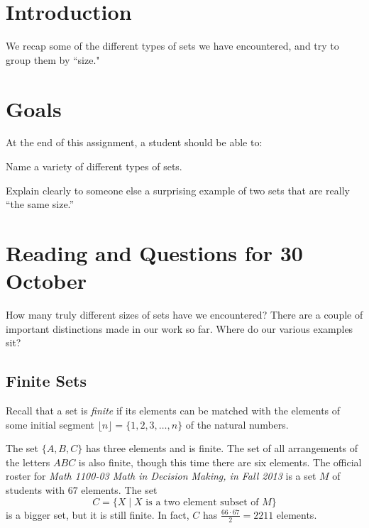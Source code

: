 \documentclass[12pt,letterpaper]{article}
\theoremstyle{definition}
\begin{document}
\setlength{\parskip}{1ex plus 0.5ex minus 0.2ex}
\setlength{\parindent}{0pt}

\pagestyle{fancy}
\cfoot{}

\section*{Introduction}
We recap some of the different types of sets we have encountered, and try to group them by ``size."

\section*{Goals}
At the end of this assignment, a student should be able to:
\begin{compactitem}
\item Name a variety of different types of sets.
\item Explain clearly to someone else a surprising example of two sets that are really ``the same size.''
\end{compactitem}

\section*{Reading and Questions for 30 October}

How many truly different sizes of sets have we encountered?
There are a couple of important distinctions made in our work so far.
Where do our various examples sit?

\subsection*{Finite Sets}

Recall that a set is \emph{finite} if its elements can be matched with the elements of some initial segment $\lfloor n \rfloor = \{ 1, 2, 3, \ldots , n \}$ of the natural numbers.

The set $\{A, B, C\}$ has three elements and is finite.
The set of all arrangements of the letters $ABC$ is also finite, though this time there are six elements.
The official roster for \emph{Math 1100-03 Math in Decision Making, in Fall 2013} is a set $M$ of students with $67$ elements.
The set
\[
C = \{ X \mid \text{$X$ is a two element subset of $M$} \}
\]
is a bigger set, but it is still finite.
In fact, $C$ has $\frac{66\cdot 67}{2} = 2211$ elements.
\end{document}
